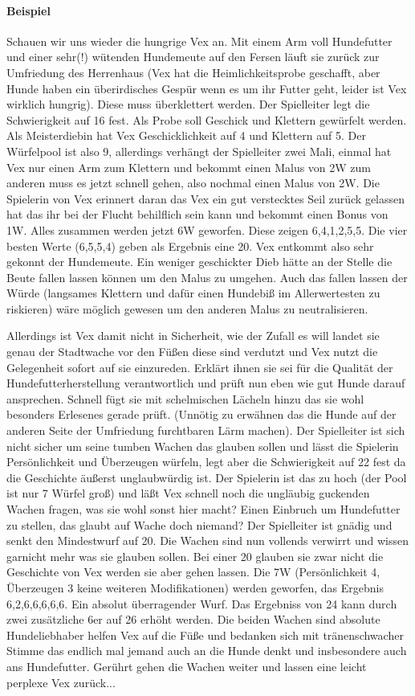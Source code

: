 \documentclass{article}
\begin{document}
\paragraph{Beispiel}

Schauen wir uns wieder die hungrige Vex an. Mit einem Arm voll Hundefutter und einer sehr(!) wütenden Hundemeute auf
den Fersen läuft sie zurück zur Umfriedung des Herrenhaus (Vex hat die Heimlichkeitsprobe geschafft, aber Hunde haben
ein überirdisches Gespür wenn es um ihr Futter geht, leider ist Vex wirklich hungrig). Diese muss überklettert werden.
Der Spielleiter legt die Schwierigkeit auf 16 fest. Als Probe soll Geschick und Klettern gewürfelt werden. Als 
Meisterdiebin hat Vex Geschicklichkeit auf 4 und Klettern auf 5. Der Würfelpool ist also 9, allerdings verhängt der
Spielleiter zwei Mali, einmal hat Vex nur einen Arm zum Klettern und bekommt einen Malus von 2W zum anderen muss es
jetzt schnell gehen, also nochmal einen Malus von 2W. Die Spielerin von Vex erinnert daran das Vex ein gut
verstecktes Seil zurück gelassen hat das ihr bei der Flucht behilflich sein kann und bekommt einen Bonus von 1W.
Alles zusammen werden jetzt 6W geworfen. Diese zeigen 6,4,1,2,5,5. Die vier besten Werte (6,5,5,4) geben als Ergebnis
eine 20. Vex entkommt also sehr gekonnt der Hundemeute.
Ein weniger geschickter Dieb hätte an der Stelle die Beute fallen lassen können um den Malus zu umgehen. Auch das
fallen lassen der Würde (langsames Klettern und dafür einen Hundebiß im Allerwertesten zu riskieren) wäre möglich
gewesen um den anderen Malus zu neutralisieren.

Allerdings ist Vex damit nicht in Sicherheit, wie der Zufall es will landet sie genau der Stadtwache vor den Füßen
diese sind verdutzt und Vex nutzt die Gelegenheit sofort auf sie einzureden. Erklärt ihnen sie sei für die Qualität
der Hundefutterherstellung verantwortlich und prüft nun eben wie gut Hunde darauf ansprechen. Schnell fügt
sie mit schelmischen Lächeln hinzu das sie wohl besonders Erlesenes gerade prüft. (Unnötig zu erwähnen das die Hunde
auf der anderen Seite der Umfriedung furchtbaren Lärm machen). Der Spielleiter ist sich nicht sicher um seine tumben
Wachen das glauben sollen und lässt die Spielerin Persönlichkeit und Überzeugen würfeln, legt aber die Schwierigkeit
auf 22 fest da die Geschichte äußerst unglaubwürdig ist. Der Spielerin ist das zu hoch (der Pool ist nur 7 Würfel
groß) und läßt Vex schnell noch die ungläubig guckenden Wachen fragen, was sie wohl sonst hier macht? Einen Einbruch
um Hundefutter zu stellen, das glaubt auf Wache doch niemand? Der Spielleiter ist gnädig und senkt den Mindestwurf
auf 20. Die Wachen sind nun vollends verwirrt und wissen garnicht mehr was sie glauben sollen. Bei einer 20 glauben
sie zwar nicht die Geschichte von Vex werden sie aber gehen lassen.
Die 7W (Persönlichkeit 4, Überzeugen 3 keine weiteren Modifikationen) werden geworfen, das Ergebnis 6,2,6,6,6,6,6.
Ein absolut überragender Wurf. Das Ergebniss von 24 kann durch zwei zusätzliche 6er auf 26 erhöht werden. Die beiden
Wachen sind absolute Hundeliebhaber helfen Vex auf die Füße und bedanken sich mit tränenschwacher Stimme das endlich
mal jemand auch an die Hunde denkt und insbesondere auch ans Hundefutter. Gerührt gehen die Wachen weiter und lassen
eine leicht perplexe Vex zurück...
\end{document}

